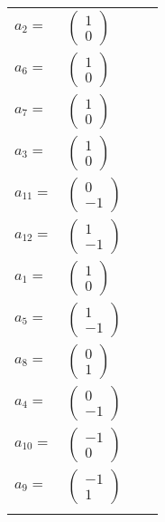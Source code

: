 \documentclass[1p]{elsarticle_modified}
\theoremstyle{definition}
\begin{document}
\begin{tabular}{m{7pt} m{180pt} m{7pt} m{180pt} }
\flushright $a_{2}=$&$\begin{pmatrix}1\\0\end{pmatrix}$ \\
\flushright $a_{6}=$&$\begin{pmatrix}1\\0\end{pmatrix}$ \\
\flushright $a_{7}=$&$\begin{pmatrix}1\\0\end{pmatrix}$ \\
\flushright $a_{3}=$&$\begin{pmatrix}1\\0\end{pmatrix}$ \\
\flushright $a_{11}=$&$\begin{pmatrix}0\\-1\end{pmatrix}$ \\
\flushright $a_{12}=$&$\begin{pmatrix}1\\-1\end{pmatrix}$ \\
\flushright $a_{1}=$&$\begin{pmatrix}1\\0\end{pmatrix}$ \\
\flushright $a_{5}=$&$\begin{pmatrix}1\\-1\end{pmatrix}$ \\
\flushright $a_{8}=$&$\begin{pmatrix}0\\1\end{pmatrix}$ \\
\flushright $a_{4}=$&$\begin{pmatrix}0\\-1\end{pmatrix}$ \\
\flushright $a_{10}=$&$\begin{pmatrix}-1\\0\end{pmatrix}$ \\
\flushright $a_{9}=$&$\begin{pmatrix}-1\\1\end{pmatrix}$\\&\end{tabular}
\end{document}
